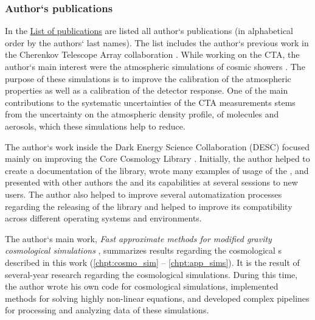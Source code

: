 \subsubsection{Author`s publications}
\begin{refsection}
In the \hyperref[chpt:list_publish]{List of publications} are listed all author`s publications (in alphabetical order by the authors` last names). The list includes the author`s previous work in the Cherenkov Telescope Array collaboration \parencite{2016arXiv161005151C,2017arXiv170903483A,2017ApJ...840...74A,2019scta.book.....C}. While working on the CTA, the author`s main interest were the atmospheric simulations of cosmic showers \parencite{2017EPJWC.14401014V,}. The purpose of these simulations is to improve the calibration of the atmospheric properties as well as a calibration of the detector response. One of the main contributions to the systematic uncertainties of the CTA measurements stems from the uncertainty on the atmospheric density profile, of molecules and aerosols, which these simulations help to reduce.

The author`s work inside the Dark Energy Science Collaboration (DESC) focused mainly on improving the Core Cosmology Library \parencite[,][]{2019ascl.soft01003C,2019ApJS..242....2C}. Initially, the author helped to create a documentation of the library, wrote many examples of usage of the , and presented with other authors the  and its capabilities at several sessions to new users. The author also helped to improve several automatization processes regarding the releasing of the library and helped to improve its compatibility across different operating systems and environments.

The author`s main work, \textit{Fast approximate methods for modified gravity cosmological simulations} \parencite[published in Monthly Notices of the Royal Astronomical Society,][]{2020MNRAS.493.2085V}, summarizes results regarding the cosmological \nbodysim s described in this work (\autoref{chpt:cosmo_sim} -- \autoref{chpt:app_sims}). It is the result of several-year research regarding the cosmological simulations. During this time, the author wrote his own code for cosmological simulations, implemented methods for solving highly non-linear equations, and developed complex pipelines for processing and analyzing data of these simulations.
\end{refsection}
